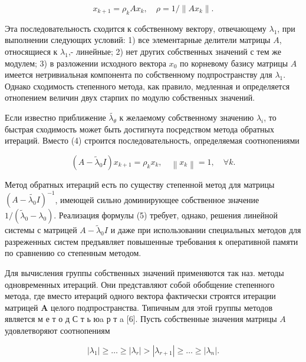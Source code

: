 \documentclass[10pt]{article}
\begin{document}
\[

x_{k+1}=\rho_{k} A x_{k}, \quad \rho=1 /\left\|A x_{k}\right\| .

\]



Эта последовательность сходится к собственному вектору, отвечающему $\lambda_{1}$, при выполнении следующих условий: 1) все элементарные делители матрицы $A$, относящиеся к $\lambda_{1}$,- линейные; 2) нет других собственных значений с тем же модулем; 3) в разложении исходного вектора $x_{0}$ по корневому базису матрицы $A$ имеется нетривиальная компонента по собственному подпространству для $\lambda_{1}$. Однако сходимость степенного метода, как правило, медленная и определяется отнопением величин двух старпих по модулю собственных значений.



Если известно приближение $\tilde{\lambda_{\theta}}$ к желаемому собственному значению $\lambda_{i}$, то быстрая сходимость может быть достигнута посредством метода обратных итераций. Вместо (4) строится последовательность, определяемая соотнопениями



\[

\left(A-\tilde{\lambda}_{0} I\right) x_{k+1}=\rho_{k} x_{k}, \quad\left\|x_{k}\right\|=1, \quad \forall k .

\]



Метод обратных итераций есть по существу степенной метод для матрицы $\left(A-\tilde{\lambda_{0}} I\right)^{-1}$, имеющей сильно доминирующее собственное значение $1 /\left(\tilde{\lambda}_{0}-\lambda_{0}\right)$. Реализация формулы (5) требует, однако, решения линейной системы с матрицей $A-\tilde{\lambda}_{0} I$ и даже при использовании специальных методов для разреженных систем предъявляет повышенные требования к оперативной памяти по сравнению со степенным методом.



Для вычисления группы собственных значений применяются так наз. методы одновременных итераций. Они представляют собой обобщение степенного метода, где вместо итераций одного вектора фактически строятся итерации матрицей $\boldsymbol{A}$ целого подпространства. Типичным для этой группы методов является м е т о д С т ь юa р т a [6]. Пусть собственные значения матрицы $A$ удовлетворяют соотнопениям



\[

\left|\lambda_{1}\right| \geqslant \ldots \geqslant\left|\lambda_{r}\right|>\left|\lambda_{r+1}\right| \geqslant \ldots \geqslant\left|\lambda_{n}\right| .

\]
\end{document}
